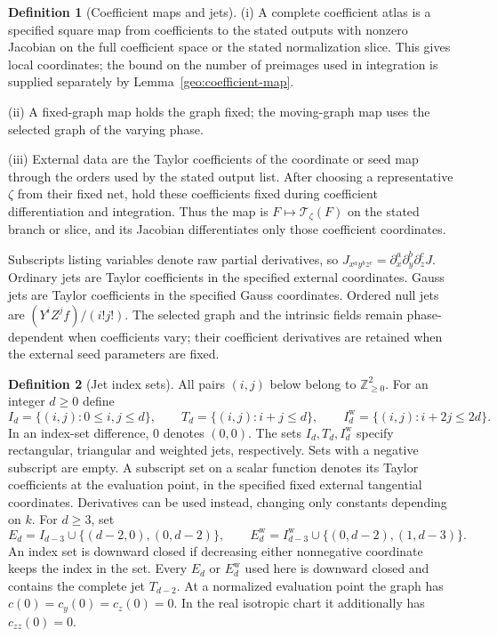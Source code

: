 \documentclass[11pt]{amsart}
\theoremstyle{definition}
\newtheorem{definition}{Definition}[section]
\theoremstyle{remark}
\numberwithin{equation}{section}
\begin{document}
\begin{definition}[Coefficient maps and jets]\label{def:coefficient-atlas}
\leavevmode\noindent\textup{(i)} A complete coefficient atlas is a specified square map from coefficients to the stated outputs with nonzero Jacobian on the full coefficient space or the stated normalization slice. This gives local coordinates; the bound on the number of preimages used in integration is supplied separately by Lemma~\ref{geo:coefficient-map}.

\noindent\textup{(ii)} A fixed-graph map holds the graph fixed; the moving-graph map uses the selected graph of the varying phase.

\noindent\textup{(iii)} External data are the Taylor coefficients of the coordinate or seed map through the orders used by the stated output list. After choosing a representative $\zeta$ from their fixed net, hold these coefficients fixed during coefficient differentiation and integration. Thus the map is $F\mapsto\mathcal T_\zeta(F)$ on the stated branch or slice, and its Jacobian differentiates only those coefficient coordinates.

Subscripts listing variables denote raw partial derivatives, so $J_{x^ay^bz^c}=\partial_x^a\partial_y^b\partial_z^cJ$. Ordinary jets are Taylor coefficients in the specified external coordinates. Gauss jets are Taylor coefficients in the specified Gauss coordinates. Ordered null jets are $(Y^iZ^jf)/(i!j!)$. The selected graph and the intrinsic fields remain phase-dependent when coefficients vary; their coefficient derivatives are retained when the external seed parameters are fixed.
\end{definition}
\begin{definition}[Jet index sets]\label{def:jet-indices}
All pairs $(i,j)$ below belong to $\mathbb Z_{\ge0}^2$. For an integer $d\ge0$ define
\[
I_d=\{(i,j):0\le i,j\le d\},\qquad T_d=\{(i,j):i+j\le d\},\qquad I_d^{\mathrm w}=\{(i,j):i+2j\le2d\}.
\]
In an index-set difference, $0$ denotes $(0,0)$. The sets $I_d,T_d,I_d^{\mathrm w}$ specify rectangular, triangular and weighted jets, respectively. Sets with a negative subscript are empty. A subscript set on a scalar function denotes its Taylor coefficients at the evaluation point, in the specified fixed external tangential coordinates. Derivatives can be used instead, changing only constants depending on $k$. For $d\ge3$, set
\[
E_d=I_{d-3}\cup\{(d-2,0),(0,d-2)\},\qquad E_d^{\mathrm w}=I_{d-3}^{\mathrm w}\cup\{(0,d-2),(1,d-3)\}.
\]
An index set is downward closed if decreasing either nonnegative coordinate keeps the index in the set. Every $E_d$ or $E_d^{\mathrm w}$ used here is downward closed and contains the complete jet $T_{d-2}$. At a normalized evaluation point the graph has $c(0)=c_y(0)=c_z(0)=0$. In the real isotropic chart it additionally has $c_{zz}(0)=0$.
\end{definition}
\end{document}
